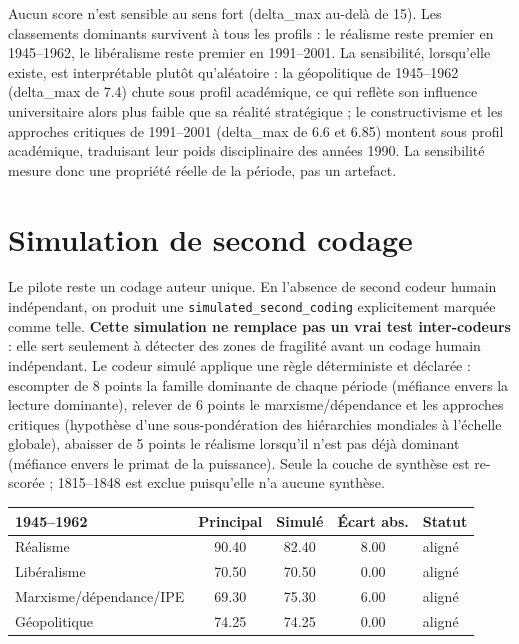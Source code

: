 \documentclass[11pt,a4paper]{article}
\begin{document}
Aucun score n'est sensible au sens fort (delta\_max au-delà de 15). Les classements dominants survivent à tous les profils : le réalisme reste premier en 1945--1962, le libéralisme reste premier en 1991--2001. La sensibilité, lorsqu'elle existe, est interprétable plutôt qu'aléatoire : la géopolitique de 1945--1962 (delta\_max de 7.4) chute sous profil académique, ce qui reflète son influence universitaire alors plus faible que sa réalité stratégique ; le constructivisme et les approches critiques de 1991--2001 (delta\_max de 6.6 et 6.85) montent sous profil académique, traduisant leur poids disciplinaire des années 1990. La sensibilité mesure donc une propriété réelle de la période, pas un artefact.

\section{Simulation de second codage}

Le pilote reste un codage auteur unique. En l'absence de second codeur humain indépendant, on produit une \texttt{simulated\_second\_coding} explicitement marquée comme telle. \textbf{Cette simulation ne remplace pas un vrai test inter-codeurs} : elle sert seulement à détecter des zones de fragilité avant un codage humain indépendant. Le codeur simulé applique une règle déterministe et déclarée : escompter de 8 points la famille dominante de chaque période (méfiance envers la lecture dominante), relever de 6 points le marxisme/dépendance et les approches critiques (hypothèse d'une sous-pondération des hiérarchies mondiales à l'échelle globale), abaisser de 5 points le réalisme lorsqu'il n'est pas déjà dominant (méfiance envers le primat de la puissance). Seule la couche de synthèse est re-scorée ; 1815--1848 est exclue puisqu'elle n'a aucune synthèse.

\begin{center}
\begin{tabular}{p{4.6cm}cccp{2cm}}
\hline
1945--1962 & Principal & Simulé & Écart abs. & Statut \\
\hline
Réalisme & 90.40 & 82.40 & 8.00 & aligné \\
Libéralisme & 70.50 & 70.50 & 0.00 & aligné \\
Marxisme/dépendance/IPE & 69.30 & 75.30 & 6.00 & aligné \\
Géopolitique & 74.25 & 74.25 & 0.00 & aligné \\
\hline
\end{tabular}
\end{center}
\end{document}
